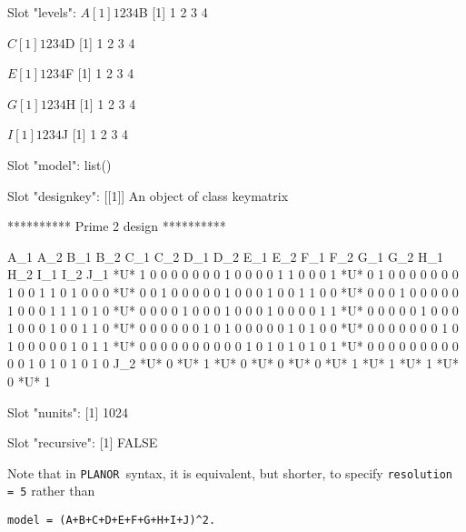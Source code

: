 \documentclass[a4paper]{article}
\newcommand{\PLANOR}{\texttt{PLANOR }}
\begin{document}
\begin{Schunk}
\begin{Soutput}
Slot "levels":
$A
[1] 1 2 3 4

$B
[1] 1 2 3 4

$C
[1] 1 2 3 4

$D
[1] 1 2 3 4

$E
[1] 1 2 3 4

$F
[1] 1 2 3 4

$G
[1] 1 2 3 4

$H
[1] 1 2 3 4

$I
[1] 1 2 3 4

$J
[1] 1 2 3 4



Slot "model":
list()

Slot "designkey":
[[1]]
An object of class keymatrix

********** Prime  2  design **********

    A_1 A_2 B_1 B_2 C_1 C_2 D_1 D_2 E_1 E_2 F_1 F_2 G_1 G_2 H_1 H_2 I_1 I_2 J_1
*U*   1   0   0   0   0   0   0   0   1   0   0   0   0   1   1   0   0   0   1
*U*   0   1   0   0   0   0   0   0   0   1   0   0   1   1   0   1   0   0   0
*U*   0   0   1   0   0   0   0   0   1   0   0   0   1   0   0   1   1   0   0
*U*   0   0   0   1   0   0   0   0   0   1   0   0   0   1   1   1   0   1   0
*U*   0   0   0   0   1   0   0   0   1   0   0   0   1   0   0   0   0   1   1
*U*   0   0   0   0   0   1   0   0   0   1   0   0   0   1   0   0   1   1   0
*U*   0   0   0   0   0   0   1   0   1   0   0   0   0   0   1   0   1   0   0
*U*   0   0   0   0   0   0   0   1   0   1   0   0   0   0   0   1   0   1   1
*U*   0   0   0   0   0   0   0   0   0   0   1   0   1   0   1   0   1   0   1
*U*   0   0   0   0   0   0   0   0   0   0   0   1   0   1   0   1   0   1   0
    J_2
*U*   0
*U*   1
*U*   0
*U*   0
*U*   0
*U*   1
*U*   1
*U*   1
*U*   0
*U*   1



Slot "nunits":
[1] 1024

Slot "recursive":
[1] FALSE
\end{Soutput}
\end{Schunk}
Note that in \PLANOR syntax, it is equivalent, but shorter, to
specify \texttt{resolution = 5} rather than 
\begin{verbatim}
model = (A+B+C+D+E+F+G+H+I+J)^2.
\end{verbatim}
\end{document}
